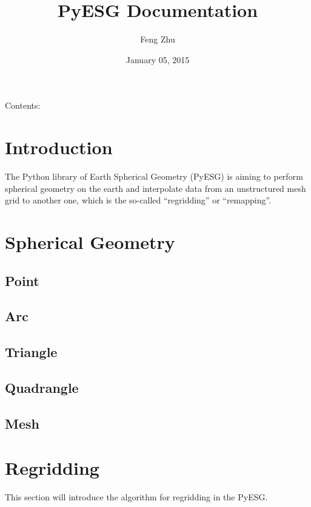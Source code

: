 \documentclass[letterpaper,10pt,english]{sphinxmanual}
\title{PyESG Documentation}
\date{January 05, 2015}
\author{Feng Zhu}
\begin{document}
\maketitle
\tableofcontents
{}\label{index::doc}


Contents:


\chapter{Introduction}
\label{introduction::doc}\label{introduction:introduction}\label{introduction:welcome-to-pyesg-s-documentation}
The Python library of Earth Spherical Geometry (PyESG) is aiming to perform spherical
geometry on the earth and interpolate data from an unstructured mesh grid to another
one, which is the so-called ``regridding'' or ``remapping''.


\chapter{Spherical Geometry}
\label{spherical_geometry:spherical-geometry}\label{spherical_geometry::doc}

\section{Point}
\label{spherical_geometry:point}

\section{Arc}
\label{spherical_geometry:arc}

\section{Triangle}
\label{spherical_geometry:triangle}

\section{Quadrangle}
\label{spherical_geometry:quadrangle}

\section{Mesh}
\label{spherical_geometry:mesh}

\chapter{Regridding}
\label{regridding:regridding}\label{regridding::doc}
This section will introduce the algorithm for regridding in the PyESG.
\end{document}
